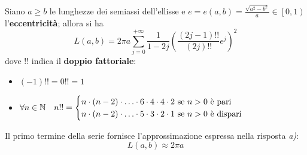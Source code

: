 \begin{theorema}~{}\\
	Siano $a\geq b$ le lunghezze dei semiassi dell'ellisse e $e=e\left(a,b\right)=\frac{\sqrt{a^2-b^2}}{a}\in\left[0,1\right)$ l'\textbf{eccentricità}; allora si ha
	\begin{equation}
		L\left(a,b\right)=2\pi a\sum_{j=0}^{+\infty}\frac{1}{1-2j}\left(\frac{\left(2j-1\right)!!}{\left(2j\right)!!}e^j\right)^2
	\end{equation}
dove $!!$ indica il \textbf{doppio fattoriale}:
\begin{itemize}
	\item $\left(-1\right)!!=0!!=1$
	\item $\forall n\in\mathbb{N}\quad n!!=\begin{cases}
		n\cdot \left(n-2\right)\cdot \ldots \cdot 6 \cdot 4 \cdot 4 \cdot 2\text{ se }n>0\text{ è pari}\\
		n\cdot \left(n-2\right)\cdot \ldots \cdot 5 \cdot 3 \cdot 2 \cdot 1\text{ se }n>0\text{ è dispari}\\
	\end{cases}$
\end{itemize}
\end{theorema}
Il primo termine della serie fornisce l'approssimazione espressa nella risposta \textit{a)}:
\begin{equation*}
	L\left(a,b\right)\approx 2\pi a
\end{equation*}
